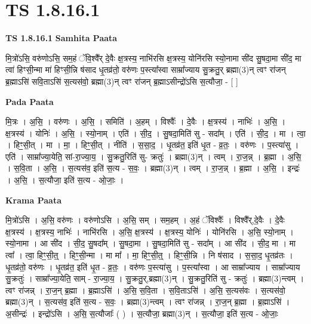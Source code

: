 \documentclass[17pt]{extarticle}
\begin{document}
\section{ TS 1.8.16.1 }

\textbf{TS 1.8.16.1 } \newline
\textbf{Samhita Paata} \newline

मि॒त्रो॑ऽसि॒ वरु॑णोऽसि॒ सम॒हं ॅवि॒श्वै᳚र् दे॒वैः क्ष॒त्रस्य॒ नाभि॑रसि क्ष॒त्रस्य॒ योनि॑रसि स्यो॒नामा सी॑द सु॒षदा॒मा सी॑द॒ मा त्वा॑ हिꣳसी॒न्मा मा॑ हिꣳसी॒न्नि ष॑साद धृ॒तव्र॑तो॒ वरु॑णः प॒स्त्या᳚स्वा साम्रा᳚ज्याय सु॒क्रतु॒र् ब्रह्मा(3)न् त्वꣳ रा॑जन् ब्र॒ह्माऽसि॑ सवि॒ताऽसि॑ स॒त्यस॑वो॒ ब्रह्मा(3)न् त्वꣳ रा॑जन् ब्र॒ह्माऽसीन्द्रो॑ऽसि स॒त्यौजा॒ - [ ] \newline

\textbf{Pada Paata} \newline

मि॒त्रः । अ॒सि॒ । वरु॑णः । अ॒सि॒ । समिति॑ । अ॒हम् । विश्वैः᳚ । दे॒वैः । क्ष॒त्रस्य॑ । नाभिः॑ । अ॒सि॒ । क्ष॒त्रस्य॑ । योनिः॑ । अ॒सि॒ । स्यो॒नाम् । एति॑ । सी॒द॒ । सु॒षदा॒मिति॑ सु - सदा᳚म् । एति॑ । सी॒द॒ । मा । त्वा॒ । हिꣳ॒॒सी॒त् । मा । मा॒ । हिꣳ॒॒सी॒त् । नीति॑ । स॒सा॒द॒ । धृ॒तव्र॑त॒ इति॑ धृ॒त - व्र॒तः॒ । वरु॑णः । प॒स्त्या॑सु । एति॑ । साम्रा᳚ज्या॒येति॒ सां-रा॒ज्या॒य॒ । सु॒क्रतु॒रिति॑ सु- क्रतुः॑ । ब्रह्मा(3)न् । त्वम् । रा॒ज॒न्न् । ब्र॒ह्मा । अ॒सि॒ । स॒वि॒ता । अ॒सि॒ । स॒त्यस॑व॒ इति॑ स॒त्य - स॒वः॒ । ब्रह्मा(3)न् । त्वम् । रा॒ज॒न्न् । ब्र॒ह्मा । अ॒सि॒ । इन्द्रः॑ । अ॒सि॒ । स॒त्यौजा॒ इति॑ स॒त्य - ओ॒जाः॒ ।  \newline


\textbf{Krama Paata} \newline

मि॒त्रो॑ऽसि । अ॒सि॒ वरु॑णः । वरु॑णोऽसि । अ॒सि॒ सम् । सम॒हम् । अ॒हं ॅविश्वैः᳚ । विश्वै᳚र्,दे॒वैः । दे॒वैः क्ष॒त्रस्य॑ । क्ष॒त्रस्य॒ नाभिः॑ । नाभि॑रसि । अ॒सि॒ क्ष॒त्रस्य॑ । क्ष॒त्रस्य॒ योनिः॑ । योनि॑रसि । अ॒सि॒ स्यो॒नाम् । स्यो॒नामा । आ सी॑द । सी॒द॒ सु॒षदा᳚म् । सु॒षदा॒मा । सु॒षदा॒मिति॑ सु - सदा᳚म् । आ सी॑द । सी॒द॒ मा । मा त्वा᳚ । त्वा॒ हिꣳ॒॒सी॒त्॒ । हिꣳ॒॒सी॒न्मा । मा मा᳚ । मा॒ हिꣳ॒॒सी॒त्॒ । हिꣳ॒॒सी॒न्नि । नि ष॑साद । स॒सा॒द॒ धृ॒तव्र॑तः । धृ॒तव्र॑तो॒ वरु॑णः । धृ॒तव्र॑त॒ इति॑ धृ॒त - व्र॒तः॒ । वरु॑णः प॒स्त्या॑सु । प॒स्त्या᳚स्वा । आ साम्रा᳚ज्याय । साम्रा᳚ज्याय सु॒क्रतुः॑ । साम्रा᳚ज्या॒येति॒ साम् - रा॒ज्या॒य॒ । सु॒क्रतु॒र्,ब्रह्मा(3)न् । सु॒क्रतु॒रिति॑ सु - क्रतुः॑ । ब्रह्मा(3)न्त्वम् । त्वꣳ रा॑जन्न् । रा॒ज॒न् ब्र॒ह्मा । ब्र॒ह्माऽसि॑ । अ॒सि॒ स॒वि॒ता । स॒वि॒ताऽसि॑ । अ॒सि॒ स॒त्यस॑वः । स॒त्यस॑वो॒ ब्रह्मा(3)न् । स॒त्यस॑व॒ इति॑ स॒त्य - स॒वः॒ । ब्रह्मा(3)न्त्वम् । त्वꣳ रा॑जन्न् । रा॒ज॒न् ब्र॒ह्मा । ब्र॒ह्माऽसि॑ । अ॒सीन्द्रः॑ । इन्द्रो॑ऽसि । अ॒सि॒ स॒त्यौजाः᳚ ( ) । स॒त्यौजा॒ ब्रह्मा(3)न् । स॒त्यौजा॒ इति॑ स॒त्य - ओ॒जाः॒ \newline
\end{document}
